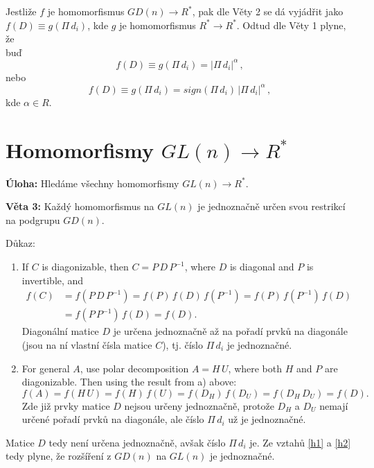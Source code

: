 \documentclass[12pt]{article}
\begin{document}
\vspace{3mm}

Jestliže $f$ je homomorfismus $GD(n) \rightarrow R^*$, pak dle Věty 2
se dá vyjádřit jako \\
$f(D) \equiv g(\Pi\, d_i)$, kde $g$ je homomorfismus $R^* \rightarrow R^*$. Odtud dle Věty 1 plyne, že  \\
buď 
\begin{equation}
\label{h1}
f(D) \equiv g(\Pi\, d_i) = |\Pi\, d_i|^\alpha \, ,
\end{equation}
nebo 
\begin{equation}
\label{h2}
f(D) \equiv g(\Pi\, d_i)= sign(\Pi\, d_i)\,|\Pi\, d_i|^\alpha \, ,
\end{equation}
kde $\alpha \in R$.
\vspace{6mm}


{\section{Homomorfismy $GL(n) \rightarrow R^*$ }} 


\textbf{Úloha:} Hledáme všechny homomorfismy $GL(n) \rightarrow R^*$.

\vspace{3mm}

\textbf{Věta 3:} Každý homomorfismus na $GL(n)$ je jednoznačně určen svou restrikcí\\
 na podgrupu $GD(n)$.

\vspace{2mm}
Důkaz: 
\vspace{1mm}
\begin{enumerate}[label=(\alph*)]
\item 
If $C$ is diagonizable, then $C=P\,D\,P^{-1}$, 
where $D$ is diagonal and $P$ is invertible, and
\begin{align*}
f(C) &= f(P\,D\,P^{-1}) = f(P)\,f(D) \,f(P^{-1}) = f(P)\,f(P^{-1})\,f(D)\\
 &=  f(P\,P^{-1})\,f(D) = f(D).
\end{align*}
Diagonální matice $D$ je určena jednoznačně až na pořadí prvků na diagonále (jsou na ní vlastní čísla matice $C$), tj. číslo $\Pi\, d_i$ je jednoznačné.

\item 
For general $A$, use polar decomposition $A=H\,U$, where both $H$ and $P$ are diagonizable. Then using the result from a) above:
\begin{equation}
\label{AD}
f(A) = f(H\,U) = f(H)\,f(U) = f(D_H)\,f(D_U) = f(D_H\,D_U) = f(D).
\end{equation}
Zde již prvky matice  $D$ nejsou určeny jednoznačně, protože $D_H$ a $D_U$ nemají určené pořadí prvků na diagonále, ale číslo $\Pi\, d_i$ už je jednoznačné.
\end{enumerate}
Matice $D$ tedy není určena jednoznačně, avšak číslo $\Pi\, d_i$ je. Ze vztahů \ref{h1} a \ref{h2} tedy plyne, že rozšíření z $GD(n)$ na $GL(n)$ je jednoznačné.
\end{document}
